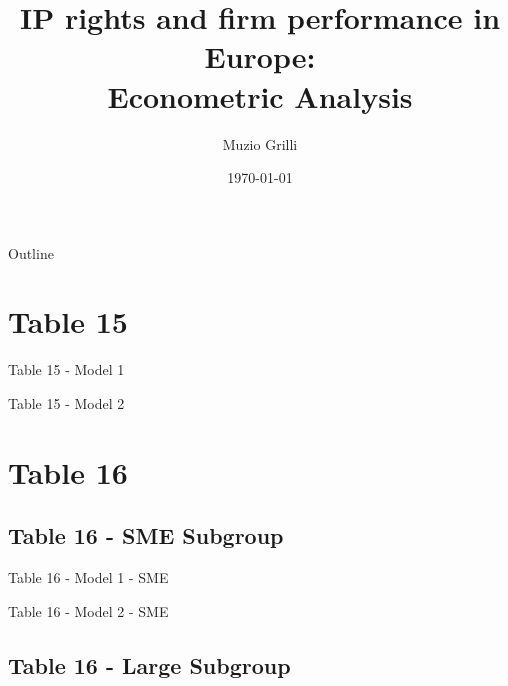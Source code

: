 \documentclass{beamer}					%
\title{IP rights and firm performance in Europe:\\ Econometric Analysis}	%
\author{Muzio Grilli}								%
\institute{European Patent Office}					%
\date{\today}									%
\begin{document}
	
	\begin{frame}
		\titlepage
	\end{frame}
	
	\begin{frame}{Outline}
		\tableofcontents
	\end{frame}
	

	
	\section{Table 15}
	
	\begin{frame}{Table 15 - Model 1}
		
	\end{frame}

	\begin{frame}{Table 15 - Model 2}
		
	\end{frame}

	\section{Table 16}
	\subsection{Table 16 - SME Subgroup}
	
	\begin{frame}{Table 16 - Model 1 - SME }
		
	\end{frame}

	\begin{frame}{Table 16 - Model 2 - SME}
		
	\end{frame}

	\subsection{Table 16 - Large Subgroup}
	
\end{document}
